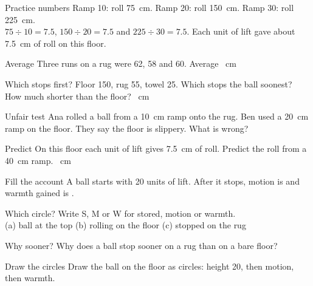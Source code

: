 \begin{worked}{Practice numbers}
Ramp 10: roll 75~cm. Ramp 20: roll 150~cm. Ramp 30: roll 225~cm.\\
$75\div10=7.5$, $150\div20=7.5$ and $225\div30=7.5$. Each unit of lift gave about 7.5~cm of roll on this floor.
\end{worked}

\begin{puzzle}{Average}
Three runs on a rug were 62, 58 and 60. Average \wline[1.6cm]~cm
\end{puzzle}

\begin{puzzle}{Which stops first?}
Floor 150, rug 55, towel 25. Which stops the ball soonest? \wline[2cm] How much shorter than the floor? \wline[1.6cm]~cm
\end{puzzle}

\begin{puzzle}{Unfair test}
Ana rolled a ball from a 10~cm ramp onto the rug. Ben used a 20~cm ramp on the floor. They say the floor is slippery. What is wrong? \wline[6cm]
\end{puzzle}

\begin{puzzle}{Predict}
On this floor each unit of lift gives 7.5~cm of roll. Predict the roll from a 40~cm ramp. \wline[1.6cm]~cm
\end{puzzle}

\begin{puzzle}{Fill the account}
A ball starts with 20 units of lift. After it stops, motion is \wline[1.6cm] and warmth gained is \wline[1.6cm].
\end{puzzle}

\clearpage

\begin{puzzle}{Which circle?}
Write S, M or W for stored, motion or warmth.\\
(a) ball at the top \wline[1cm] \quad (b) rolling on the floor \wline[1cm] \quad (c) stopped on the rug \wline[1cm]
\end{puzzle}

\begin{puzzle}{Why sooner?}
Why does a ball stop sooner on a rug than on a bare floor? \wline[6cm]
\end{puzzle}

\begin{puzzle}{Draw the circles}
Draw the ball on the floor as circles: height 20, then motion, then warmth.
\begin{center}\end{center}
\end{puzzle}

